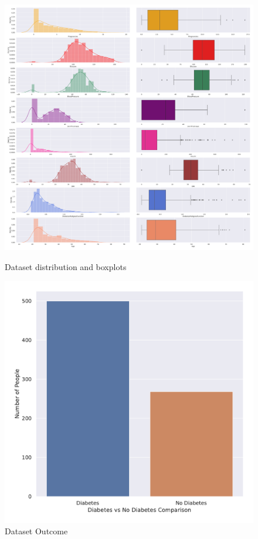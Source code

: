 \documentclass[11pt]{article}
\begin{document}
	\begin{figure}[H]
		\begin{minipage}[b]{0.65\textwidth}
			\centering
			\includegraphics[width=\textwidth]{img/dataset_distibutionAndBoxPlot.pdf}
			\caption{Dataset distribution and boxplots}
			\label{fig:distributionBoxplot}
		\end{minipage}
		\begin{minipage}[b]{0.35\textwidth}
			\centering
			\includegraphics[width=\textwidth]{img/dataset_diabetes_and_non_diabetes.pdf}
			\caption{Dataset Outcome}
			\label{fig:outcome}
		\end{minipage}
	\end{figure}
\end{document}
